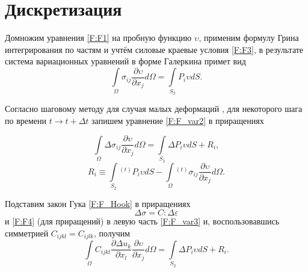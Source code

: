 \section{Дискретизация}
Домножим уравнения \eqref{F:F1} на пробную функцию $\upsilon$, применим формулу Грина интегрирования по частям и учтём силовые краевые условия \eqref{F:F3}, в результате система вариационных уравнений в форме Галеркина примет вид \cite{SoloveychikRoyakPersova2007}
\begin{equation}
\int\limits_{\Omega}\sigma_{ij}\frac{\partial\upsilon}{\partial x_j}  d\Omega=\int\limits_{S_{2}}P_{i} \upsilon dS.
\label{F:F_var2}
\end{equation}

Согласно шаговому методу для случая малых деформаций \cite{Zienkiewicz1975,Frolov1995}, для некоторого шага по времени $t\longrightarrow t+\Delta t$ запишем уравнение \eqref{F:F_var2} в приращениях

\begin{equation}
\int\limits_{\Omega}\Delta\sigma_{ij}\frac{\partial\upsilon}{\partial x_j} d\Omega=\int\limits_{S_{2}}\Delta P_{i} \upsilon dS + R_{i},
\label{F:F_var3}
\end{equation}
\begin{equation}
R_{i} \equiv \int\limits_{S_{2}}{}^{(t)}P_{i} \upsilon dS - \int\limits_{\Omega}{}^{(t)}\sigma_{ij}\frac{\partial\upsilon}{\partial x_j} d\Omega.
\label{F:F_var3_add}
\end{equation}

Подставим закон Гука \eqref{F:F_Hook} в приращениях
\begin{equation}
\Delta\sigma=C:\Delta\varepsilon
\label{F:F_alg_ce1}
\end{equation}
и \eqref{F:F4} (для приращений) в левую часть \eqref{F:F_var3} и, воспользовавшись симметрией \mbox{${C}_{ijkl}={C}_{ijlk}$}, получим 
\begin{equation}
\int\limits_{\Omega}{C}_{ijkl} \frac{\partial \Delta u_{k}}{\partial x_{l}} \frac{\partial\upsilon}{\partial x_j}d\Omega=\int\limits_{S_{2}}\Delta P_{i}\upsilon dS
+R_{i}.
\label{F:F_alg_var1}
\end{equation}

